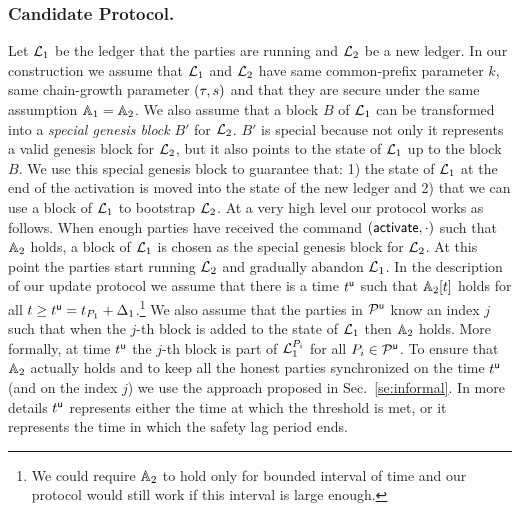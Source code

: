 \subsubsection{Candidate Protocol.}

Let $\mathcal{L}_1$ be the ledger that the parties are running and $\mathcal{L}_2$ be a new ledger.
In our construction we assume that $\mathcal{L}_1$ and $\mathcal{L}_2$ have same common-prefix parameter $k$, same chain-growth parameter $(\tau, s)$ and that they are secure under the same assumption $\mathbb{A}_1=\mathbb{A}_2$. We also assume that a block $B$ of $\mathcal{L}_1$ can be transformed into a \emph{special genesis block} $B'$ for $\mathcal{L}_2$. $B'$ is special because not only
it represents a valid genesis block for $\mathcal{L}_2$, but it also points to the state of $\mathcal{L}_1$ up to the block $B$. 
We use this special genesis block to guarantee that: 1) the state of $\mathcal{L}_1$ at the end of the activation is moved into the state of the new ledger
and 2) that we can use a block of $\mathcal{L}_1$ to bootstrap $\mathcal{L}_2$.
At a very high level our protocol works as follows. When enough parties have received the command $(\mathsf{activate},\cdot)$ such that $\mathbb{A}_2$ holds,
a block of $\mathcal{L}_1$ is chosen as the special genesis block for $\mathcal{L}_2$. At this point the parties start running $\mathcal{L}_2$ and gradually abandon 
$\mathcal{L}_1$.
In the description of our update protocol we assume that there is a time $t^{\mathsf{u}}$ such that $\mathbb{A}_2[t]$ holds for all $t\geq t^{\mathsf{u}}=t_{P_1}+\Delta_1$.\footnote{We could require $\mathbb{A}_2$ to
hold only for bounded interval of time and our protocol would still work if this interval is large enough.}
We also assume that the parties in $\mathcal{P}^\mathsf{u}$ know an index $j$ such that when the $j$-th block is added to the state of $\mathcal{L}_1$ then $\mathbb{A}_2$ holds. 
More formally, at time $t^{\mathsf{u}}$ the $j$-th block is part of $\mathcal{L}_1^{P_i}$ for all $P_i\in\mathcal{P}^\mathsf{u}$.
To ensure that $\mathbb{A}_2$ actually holds and to keep all the honest parties synchronized on the time $t^{\mathsf{u}}$ (and on the index $j$) we use the approach proposed in Sec.~\ref{se:informal}.
In more details $t^{\mathsf{u}}$ represents either the time at which the threshold is met, or it represents the time in which the safety lag period ends.
 


